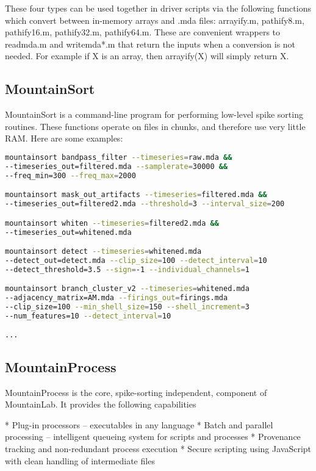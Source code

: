 \documentclass{article}
\begin{document}
These four types can be used together in driver scripts via the following functions which convert between in-memory arrays and .mda files: arrayify.m, pathify8.m, pathify16.m, pathify32.m, pathify64.m. These are convenient wrappers to readmda.m and writemda*.m that return the inputs when a conversion is not needed. For example if X is an array, then arrayify(X) will simply return X.

\subsection{MountainSort}

MountainSort is a command-line program for performing low-level spike sorting routines. These functions operate on files in chunks, and therefore use very little RAM. Here are some examples:

\begin{lstlisting}[language=bash]
mountainsort bandpass_filter --timeseries=raw.mda &&
--timeseries_out=filtered.mda --samplerate=30000 &&
--freq_min=300 --freq_max=2000

mountainsort mask_out_artifacts --timeseries=filtered.mda &&
--timeseries_out=filtered2.mda --threshold=3 --interval_size=200

mountainsort whiten --timeseries=filtered2.mda &&
--timeseries_out=whitened.mda

mountainsort detect --timeseries=whitened.mda
--detect_out=detect.mda --clip_size=100 --detect_interval=10
--detect_threshold=3.5 --sign=-1 --individual_channels=1

mountainsort branch_cluster_v2 --timeseries=whitened.mda
--adjacency_matrix=AM.mda --firings_out=firings.mda
--clip_size=100 --min_shell_size=150 --shell_increment=3
--num_features=10 --detect_interval=10

...

\end{lstlisting}

\subsection{MountainProcess}

MountainProcess is the core, spike-sorting independent, component of MountainLab. It provides the following capabilities

* Plug-in processors -- executables in any language
* Batch and parallel processing -- intelligent queueing system for scripts and processes
* Provenance tracking and non-redundant process execution
* Secure scripting using JavaScript with clean handling of intermediate files
\end{document}
